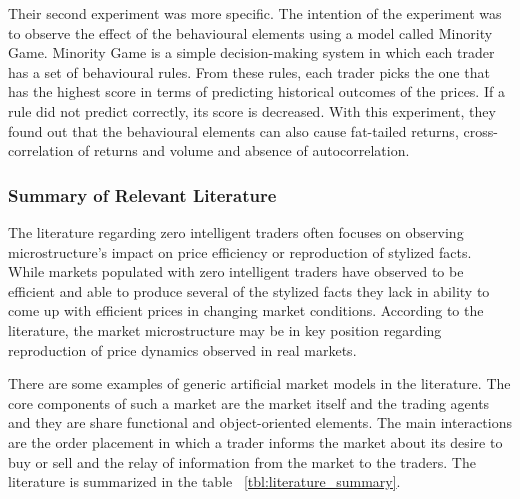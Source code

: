 Their second experiment was more specific. The intention of the experiment 
was to observe the effect of the behavioural elements using a model called
Minority Game. Minority Game is a simple decision-making system in
which each trader has a set of behavioural rules. From these rules, each
trader picks the one that has the highest score in terms of predicting 
historical outcomes of the prices. If a rule did not predict correctly,
its score is decreased. With this experiment, they found out that the
behavioural elements can also cause fat-tailed returns, cross-correlation 
of returns and volume and absence of autocorrelation.


\subsubsection{Summary of Relevant Literature}

The literature regarding zero intelligent traders often focuses 
on observing microstructure's impact on price efficiency or reproduction 
of stylized facts. While markets populated with zero intelligent traders 
have observed to be efficient and able to produce several of the stylized 
facts they lack in ability to come up with efficient prices in changing 
market conditions. According to the literature, the market microstructure 
may be in key position regarding reproduction of price dynamics observed 
in real markets. 

There are some examples of generic artificial market models in the literature. 
The core components of such a market are the market itself and the trading agents 
and they are share functional and object-oriented elements. The main interactions 
are the order placement in which a trader informs the market about its desire to 
buy or sell and the relay of information from the market to the traders. The 
literature is summarized in the table ~\ref{tbl:literature_summary}.





